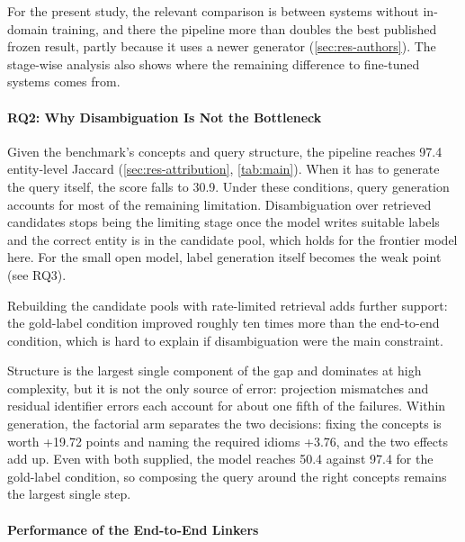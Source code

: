 For the present study, the relevant comparison is between systems without in-domain training, and there the pipeline more than doubles the best published frozen result, partly because it uses a newer generator (\cref{sec:res-authors}).
The stage-wise analysis also shows where the remaining difference to fine-tuned systems comes from.

\paragraph{RQ2: Why Disambiguation Is Not the
Bottleneck}

\label{sec:disc-rq2}

Given the benchmark's concepts and query structure, the pipeline reaches 97.4 entity-level Jaccard (\cref{sec:res-attribution}, \cref{tab:main}).
When it has to generate the query itself, the score falls to 30.9.
Under these conditions, query generation accounts for most of the remaining limitation.
Disambiguation over retrieved candidates stops being the limiting stage once the model writes suitable labels and the correct entity is in the candidate pool, which holds for the frontier model here.
For the small open model, label generation itself becomes the weak point (see RQ3).

Rebuilding the candidate pools with rate-limited retrieval adds further support: the gold-label condition improved roughly ten times more than the end-to-end condition, which is hard to explain if disambiguation were the main constraint.

Structure is the largest single component of the gap and dominates at high complexity, but it is not the only source of error: projection mismatches and residual identifier errors each account for about one fifth of the failures.
Within generation, the factorial arm separates the two decisions: fixing the concepts is worth +19.72 points and naming the required idioms +3.76, and the two effects add up.
Even with both supplied, the model reaches 50.4 against 97.4 for the gold-label condition, so composing the query around the right concepts remains the largest single step.

\paragraph{Performance of the End-to-End Linkers}

